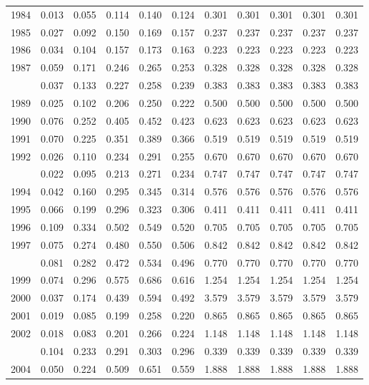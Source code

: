 \documentclass[
]{article}
\begin{document}
\begin{longtable}[t]{lrrrrrrrrrr}
1984 & 0.013 & 0.055 & 0.114 & 0.140 & 0.124 & 0.301 & 0.301 & 0.301 & 0.301 & 0.301\\
1985 & 0.027 & 0.092 & 0.150 & 0.169 & 0.157 & 0.237 & 0.237 & 0.237 & 0.237 & 0.237\\
1986 & 0.034 & 0.104 & 0.157 & 0.173 & 0.163 & 0.223 & 0.223 & 0.223 & 0.223 & 0.223\\
1987 & 0.059 & 0.171 & 0.246 & 0.265 & 0.253 & 0.328 & 0.328 & 0.328 & 0.328 & 0.328\\
\addlinespace
1988 & 0.037 & 0.133 & 0.227 & 0.258 & 0.239 & 0.383 & 0.383 & 0.383 & 0.383 & 0.383\\
1989 & 0.025 & 0.102 & 0.206 & 0.250 & 0.222 & 0.500 & 0.500 & 0.500 & 0.500 & 0.500\\
1990 & 0.076 & 0.252 & 0.405 & 0.452 & 0.423 & 0.623 & 0.623 & 0.623 & 0.623 & 0.623\\
1991 & 0.070 & 0.225 & 0.351 & 0.389 & 0.366 & 0.519 & 0.519 & 0.519 & 0.519 & 0.519\\
1992 & 0.026 & 0.110 & 0.234 & 0.291 & 0.255 & 0.670 & 0.670 & 0.670 & 0.670 & 0.670\\
\addlinespace
1993 & 0.022 & 0.095 & 0.213 & 0.271 & 0.234 & 0.747 & 0.747 & 0.747 & 0.747 & 0.747\\
1994 & 0.042 & 0.160 & 0.295 & 0.345 & 0.314 & 0.576 & 0.576 & 0.576 & 0.576 & 0.576\\
1995 & 0.066 & 0.199 & 0.296 & 0.323 & 0.306 & 0.411 & 0.411 & 0.411 & 0.411 & 0.411\\
1996 & 0.109 & 0.334 & 0.502 & 0.549 & 0.520 & 0.705 & 0.705 & 0.705 & 0.705 & 0.705\\
1997 & 0.075 & 0.274 & 0.480 & 0.550 & 0.506 & 0.842 & 0.842 & 0.842 & 0.842 & 0.842\\
\addlinespace
1998 & 0.081 & 0.282 & 0.472 & 0.534 & 0.496 & 0.770 & 0.770 & 0.770 & 0.770 & 0.770\\
1999 & 0.074 & 0.296 & 0.575 & 0.686 & 0.616 & 1.254 & 1.254 & 1.254 & 1.254 & 1.254\\
2000 & 0.037 & 0.174 & 0.439 & 0.594 & 0.492 & 3.579 & 3.579 & 3.579 & 3.579 & 3.579\\
2001 & 0.019 & 0.085 & 0.199 & 0.258 & 0.220 & 0.865 & 0.865 & 0.865 & 0.865 & 0.865\\
2002 & 0.018 & 0.083 & 0.201 & 0.266 & 0.224 & 1.148 & 1.148 & 1.148 & 1.148 & 1.148\\
\addlinespace
2003 & 0.104 & 0.233 & 0.291 & 0.303 & 0.296 & 0.339 & 0.339 & 0.339 & 0.339 & 0.339\\
2004 & 0.050 & 0.224 & 0.509 & 0.651 & 0.559 & 1.888 & 1.888 & 1.888 & 1.888 & 1.888\\

\end{longtable}
\end{document}
